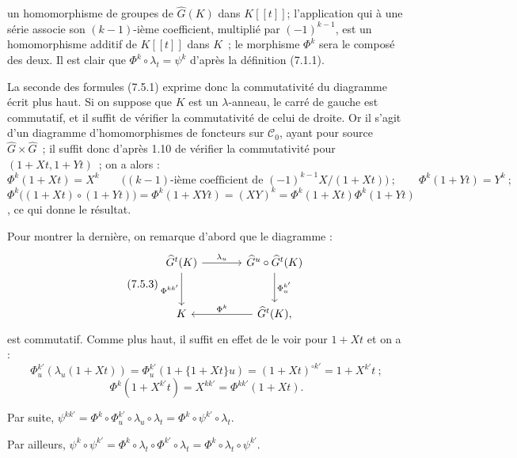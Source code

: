 
un homomorphisme de groupes de \(\widehat G(K)\) dans \(K[[t]]\); l'application qui à une série associe son \((k-1)\)-ième coefficient, multiplié par \((-1)^{k-1}\), est un homomorphisme additif de \(K[[t]]\) dans \(K\)~; le morphisme \(\Phi^k\) sera le composé des deux. Il est clair que \(\Phi^k\circ\lambda_t=\psi^k\) d'après la définition (7.1.1).

La seconde des formules (7.5.1) exprime donc la commutativité du diagramme écrit plus haut. Si on suppose que \(K\) est un \(\lambda\)-anneau, le carré de gauche est commutatif, et il suffit de vérifier la commutativité de celui de droite. Or il s'agit d'un diagramme d'homomorphismes de foncteurs sur \(\mathcal C_0\), ayant pour source \(\widehat G\times\widehat G\)~; il suffit donc d'après 1.10 de vérifier la commutativité pour \((1+Xt,1+Yt)\)~; on a alors :
\[
  \Phi^k(1+Xt)=X^k\qquad\bigl(\text{$(k-1)$-ième coefficient de }(-1)^{k-1}X/(1+Xt)\bigr)~;\qquad
  \Phi^k(1+Yt)=Y^k~;
\]
\(\Phi^k\bigl((1+Xt)\circ(1+Yt)\bigr)=\Phi^k(1+XYt)=(XY)^k=\Phi^k(1+Xt)\Phi^k(1+Yt)\), ce qui donne le résultat.

Pour montrer la dernière, on remarque d'abord que le diagramme :
\begin{equation}\tag{7.5.3}
\begin{tikzcd}[column sep=large,row sep=large]
\widehat G^t(K) \arrow[r,"\lambda_u"] \arrow[d,"\Phi^{kk'}"'] &
\widehat G^u\circ\widehat G^t(K) \arrow[d,"\Phi^{k'}_u"]\\
K &
\widehat G^t(K), \arrow[l,"\Phi^k"']
\end{tikzcd}
\end{equation}
est commutatif. Comme plus haut, il suffit en effet de le voir pour \(1+Xt\) et on a :
\[
  \Phi^{k'}_u(\lambda_u(1+Xt))
  =
  \Phi^{k'}_u(1+\{1+Xt\}u)
  =
  (1+Xt)^{\circ k'}
  =
  1+X^{k'}t~;
\]
\[
  \Phi^k(1+X^{k'}t)=X^{kk'}=\Phi^{kk'}(1+Xt).
\]

Par suite, \(\psi^{kk'}=\Phi^k\circ\Phi^{k'}_u\circ\lambda_u\circ\lambda_t=\Phi^k\circ\psi^{k'}\circ\lambda_t\).

Par ailleurs, \(\psi^k\circ\psi^{k'}=\Phi^k\circ\lambda_t\circ\Phi^{k'}\circ\lambda_t=\Phi^k\circ\lambda_t\circ\psi^{k'}\).
